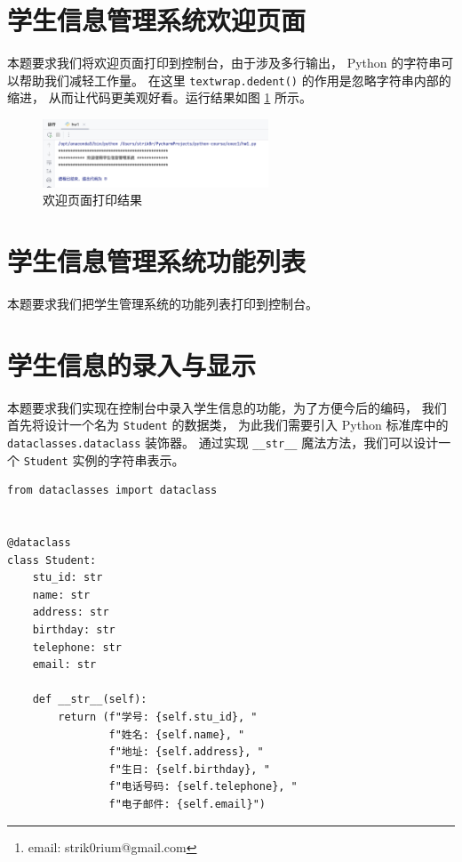 \documentclass[openany, 10pt]{ctexart}
\title{\thetitle}
\author{Strik0r
\thanks{email: strik0rium@gmail.com}}
\begin{document}


\newpage
{\small \setlength{\parskip}{0em} \tableofcontents}

\section{学生信息管理系统欢迎页面}

本题要求我们将欢迎页面打印到控制台，由于涉及多行输出，
Python 的字符串可以帮助我们减轻工作量。
在这里 \lstinline`textwrap.dedent()` 的作用是忽略字符串内部的缩进，
从而让代码更美观好看。运行结果如图 \ref{fig:欢迎页面打印结果} 所示。


\begin{figure}[H]
    \centering \small
    \includegraphics[width=0.6\textwidth]{pic/hw1-result/截屏2025-07-05 11.49.12}
    \caption{欢迎页面打印结果}
    \label{fig:欢迎页面打印结果}
\end{figure}

\section{学生信息管理系统功能列表}

本题要求我们把学生管理系统的功能列表打印到控制台。


\section{学生信息的录入与显示}

本题要求我们实现在控制台中录入学生信息的功能，为了方便今后的编码，
我们首先将设计一个名为 \lstinline`Student` 的数据类，
为此我们需要引入 Python 标准库中的 \lstinline|dataclasses.dataclass| 装饰器。
通过实现 \lstinline|__str__| 魔法方法，我们可以设计一个 \lstinline|Student| 实例的字符串表示。
\begin{lstlisting}
from dataclasses import dataclass


@dataclass
class Student:
    stu_id: str
    name: str
    address: str
    birthday: str
    telephone: str
    email: str

    def __str__(self):
        return (f"学号: {self.stu_id}, "
                f"姓名: {self.name}, "
                f"地址: {self.address}, "
                f"生日: {self.birthday}, "
                f"电话号码: {self.telephone}, "
                f"电子邮件: {self.email}")
\end{lstlisting}
\end{document}

